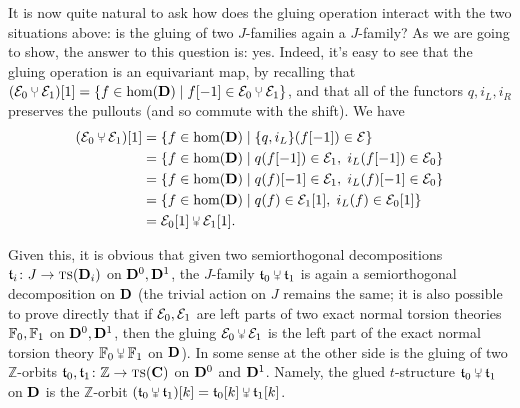 It is now quite natural to ask how does the gluing operation interact with the two situations above: is the gluing of two $J$\hyp{}families again a $J$\hyp{}family? As we are going to show, the answer to this question is: yes. Indeed, it's easy to see that the gluing operation is an equivariant map, by recalling that $(\EE_0\glue \EE_1)[1] = \{f\in\hom(\D)\mid f[-1]\in \EE_0\glue \EE_1\}$, and that all of the functors $q,i_L,i_R$ preserves the pullouts (and so commute with the shift). We have
\begin{align*}
(\EE_0\glue \EE_1)[1] &= \{ f\in\hom(\D)\mid \{q, i_L\}(f[-1])\in \EE\}\\
&= \{ f\in\hom(\D)\mid q(f[-1])\in \EE_1,\hspace{1mm} i_L(f[-1])\in\EE_0\}\\
&= \{ f\in\hom(\D)\mid q(f)[-1]\in \EE_1,\hspace{1mm} i_L(f)[-1]\in\EE_0\}\\
&= \{ f\in\hom(\D)\mid q(f) \in \EE_1[1],\hspace{1mm} i_L(f)\in \EE_0[1]\}\\
&= \EE_0 [1]\glue \EE_1[1].
\end{align*}


Given this, it is obvious that given two semiorthogonal decompositions $\mathfrak{t}_i\colon J\to  \text{\scshape ts} (\mathbf{D}_i)$ on $\mathbf{D}^0, \mathbf{D}^1$, the $J$\hyp{}family $\tee_0\glue\tee_1$ is again a semiorthogonal decomposition on $\mathbf{D}$ (the trivial action on $J$ remains the same; it is also possible to prove directly that if $\mathcal{E}_0,\mathcal{E}_1$ are left parts of two exact normal torsion theories $\mathbb{F}_0,\mathbb{F}_1$ on $\mathbf{D}^0, \mathbf{D}^1$, then the gluing $\EE_0\glue \EE_1$ is the left part of the exact normal torsion theory $\fF_0\glue\fF_1$ on $\mathbf{D}$).
In some sense at the other side is the gluing of two $\mathbb{Z}$\hyp{}orbits $\mathfrak{t}_0,\mathfrak{t}_1\colon \mathbb{Z}\to  \text{\scshape ts} (\mathbf{C})$ on $\mathbf{D}^0$ and $\mathbf{D}^1$. Namely, the glued $t$\hyp{}structure $\tee_0\glue\tee_1$ on $\mathbf{D}$ is the $\mathbb{Z}$\hyp{}orbit $(\tee_0 \glue \tee_1)[k] = \tee_0[k]\glue \tee_1[k]$. 

